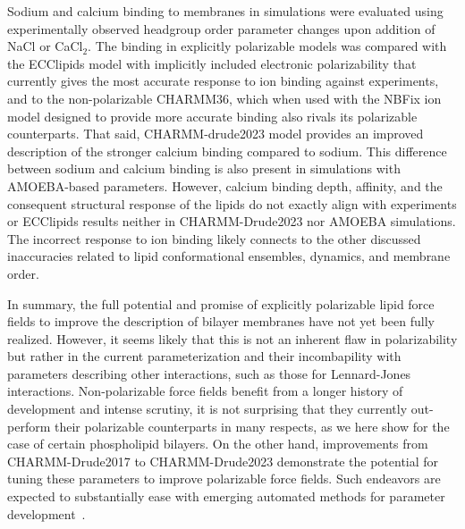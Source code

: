 \documentclass[journal=jctcce,manuscript=article,layout=singlecolumn]{achemso}
\begin{document}
Sodium and calcium binding to membranes in simulations were evaluated using experimentally observed headgroup order parameter changes upon addition of NaCl or CaCl$_2$. The binding in explicitly polarizable models was compared with the ECClipids model with implicitly included electronic polarizability that currently gives the most accurate response to ion binding against experiments, and to the non-polarizable CHARMM36, which when used with the NBFix ion model designed to provide more accurate binding also rivals its polarizable counterparts. 
That said, CHARMM-drude2023 model provides an improved description of the stronger calcium binding compared to sodium. This difference between sodium and calcium binding is also present in simulations with AMOEBA-based parameters. However, calcium
binding depth, affinity, and the consequent structural response of the lipids do not exactly align with experiments or ECClipids results neither in CHARMM-Drude2023 nor AMOEBA simulations. The incorrect response to ion binding likely connects to the other discussed inaccuracies related to lipid conformational ensembles, dynamics, and membrane order.

 In summary, the full potential and promise of explicitly polarizable lipid force fields to improve the description of bilayer membranes have not yet been fully realized. However, it seems likely that this is not an inherent flaw in polarizability but rather in the current parameterization and their incombapility with parameters describing other interactions, such as those for Lennard-Jones interactions. Non-polarizable force fields benefit from a longer history of development and intense scrutiny, it is not surprising that they currently
 out-perform their polarizable counterparts in many respects, as we here show for the case of certain phospholipid bilayers. On the other hand, improvements  
from CHARMM-Drude2017 to CHARMM-Drude2023 demonstrate the potential for tuning these parameters to improve polarizable force fields. Such endeavors are expected to substantially ease with emerging automated methods for parameter development~\cite{Antila2022,yu2023drude}.
\end{document}
